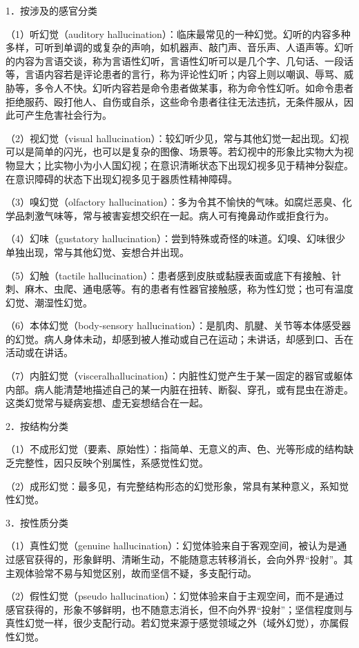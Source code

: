1．按涉及的感官分类

（1）听幻觉（auditory
hallucination）：临床最常见的一种幻觉。幻听的内容多种多样，可听到单调的或复杂的声响，如机器声、敲门声、音乐声、人语声等。幻听的内容为言语交谈，称为言语性幻听，言语性幻听可以是几个字、几句话、一段话等，言语内容若是评论患者的言行，称为评论性幻听；内容上则以嘲讽、辱骂、威胁等，多令人不快。幻听内容若是命令患者做某事，称为命令性幻听。如命令患者拒绝服药、殴打他人、自伤或自杀，这些命令患者往往无法违抗，无条件服从，因此可产生危害社会行为。

（2）视幻觉（visual
hallucination）：较幻听少见，常与其他幻觉一起出现。幻视可以是简单的闪光，也可以是复杂的图像、场景等。若幻视中的形象比实物大为视物显大；比实物小为小人国幻视；在意识清晰状态下出现幻视多见于精神分裂症。在意识障碍的状态下出现幻视多见于器质性精神障碍。

（3）嗅幻觉（olfactory
hallucination）：多为令其不愉快的气味。如腐烂恶臭、化学品刺激气味等，常与被害妄想交织在一起。病人可有掩鼻动作或拒食行为。

（4）幻味（gustatory
hallucination）：尝到特殊或奇怪的味道。幻嗅、幻味很少单独出现，常与其他幻觉、妄想合并出现。

（5）幻触（tactile
hallucination）：患者感到皮肤或黏膜表面或底下有接触、针刺、麻木、虫爬、通电感等。有的患者有性器官接触感，称为性幻觉；也可有温度幻觉、潮湿性幻觉。

（6）本体幻觉（body-sensory
hallucination）：是肌肉、肌腱、关节等本体感受器的幻觉。病人身体未动，却感到被人推动或自己在运动；未讲话，却感到口、舌在活动或在讲话。

（7）内脏幻觉（visceralhallucination）：内脏性幻觉产生于某一固定的器官或躯体内部。病人能清楚地描述自己的某一内脏在扭转、断裂、穿孔，或有昆虫在游走。这类幻觉常与疑病妄想、虚无妄想结合在一起。

2．按结构分类

（1）不成形幻觉（要素、原始性）：指简单、无意义的声、色、光等形成的结构缺乏完整性，因只反映个别属性，系感觉性幻觉。

（2）成形幻觉：最多见，有完整结构形态的幻觉形象，常具有某种意义，系知觉性幻觉。

3．按性质分类

（1）真性幻觉（genuine
hallucination）：幻觉体验来自于客观空间，被认为是通过感官获得的，形象鲜明、清晰生动，不能随意志转移消长，会向外界“投射”。其主观体验常不易与知觉区别，故而坚信不疑，多支配行动。

（2）假性幻觉（pseudo
hallucination）：幻觉体验来自于主观空间，而不是通过感官获得的，形象不够鲜明，也不随意志消长，但不向外界“投射”；坚信程度则与真性幻觉一样，很少支配行动。若幻觉来源于感觉领域之外（域外幻觉），亦属假性幻觉。

